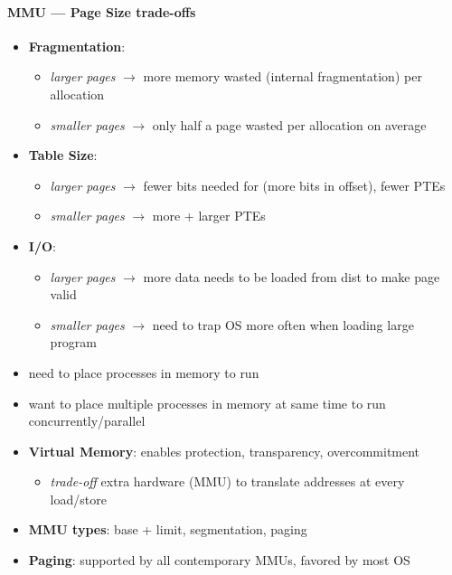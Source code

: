 \paragraph{MMU --- Page Size trade-offs}
\begin{itemize}
  \item \textbf{Fragmentation}:
  \begin{itemize}
    \item \emph{larger pages} \( \to \) more memory wasted (internal fragmentation) per allocation
    \item \emph{smaller pages} \( \to \) only half a page wasted per allocation on average
  \end{itemize}
  \item \textbf{Table Size}:
  \begin{itemize}
    \item \emph{larger pages} \( \to \) fewer bits needed for  (more bits in offset), fewer PTEs
    \item \emph{smaller pages} $ \to $ more + larger PTEs
  \end{itemize}
  \item \textbf{I/O}:
  \begin{itemize}
    \item \emph{larger pages} $ \to $ more data needs to be loaded from dist to make page valid
    \item \emph{smaller pages} $ \to $ need to trap OS more often when loading large program
  \end{itemize}
\end{itemize}

\begin{summary}
  \begin{itemize}
    \item need to place processes in memory to run
    \item want to place multiple processes in memory at same time to run concurrently/parallel
    \item \textbf{Virtual Memory}: enables protection, transparency, overcommitment
    \begin{itemize}
      \item \emph{trade-off} extra hardware (MMU) to translate addresses at every load/store
    \end{itemize}
    \item \textbf{MMU types}: base + limit, segmentation, paging
    \item \textbf{Paging}: supported by all contemporary MMUs, favored by most OS
  \end{itemize}
\end{summary}
